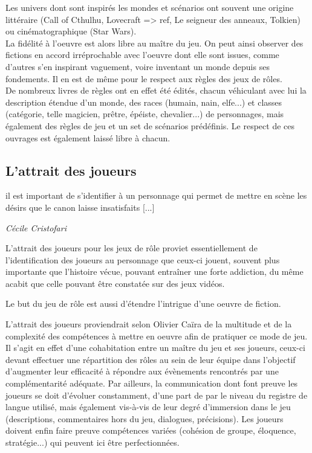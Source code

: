 Les univers dont sont inspirés les mondes et scénarios ont souvent une origine littéraire (Call of Cthulhu, Lovecraft => ref, Le seigneur des anneaux, Tolkien) ou cinématographique (Star Wars).\\
La fidélité à l'oeuvre est alors libre au maître du jeu. On peut ainsi observer des fictions en accord irréprochable avec l'oeuvre dont elle sont issues, comme d'autres s'en inspirant vaguement, voire inventant un monde depuis ses fondements. Il en est de même pour le respect aux règles des jeux de rôles.\\
De nombreux livres de règles ont en effet été édités, chacun véhiculant avec lui la description étendue d'un monde, des races (humain, nain, elfe...) et classes (catégorie, telle magicien, prêtre, épéiste, chevalier...) de personnages, mais également des règles de jeu et un set de scénarios prédéfinis. Le respect de ces ouvrages est également laissé libre à chacun.\\


\subsection{L'attrait des joueurs}
\begin{shadequote}
[...] il est important de s’identifier à un personnage qui permet de mettre en scène les désirs que le canon laisse insatisfaits [...]
\par\emph{C{\'e}cile Cristofari}
\end{shadequote}

L'attrait des joueurs pour les jeux de rôle proviet essentiellement de l'identification des joueurs au personnage que ceux-ci jouent, souvent plus importante que l'histoire vécue, pouvant entraîner une forte addiction, du même acabit que celle pouvant être constatée sur des jeux vidéos.

Le but du jeu de rôle est aussi d'étendre l'intrigue d'une oeuvre de fiction.

L'attrait des joueurs proviendrait selon Olivier Caïra\cite{caira2007jeux} de la multitude et de la complexité des compétences à mettre en oeuvre afin de pratiquer ce mode de jeu. Il s'agit en effet d'une cohabitation entre un maître du jeu et ses joueurs, ceux-ci devant effectuer une répartition des rôles au sein de leur équipe dans l'objectif d'augmenter leur efficacité à répondre aux évènements rencontrés par une complémentarité adéquate. Par ailleurs, la communication dont font preuve les joueurs se doit d'évoluer constamment, d'une part de par le niveau du registre de langue utilisé, mais également vis-à-vis de leur degré d'immersion dans le jeu (descriptions, commentaires hors du jeu, dialogues, précisions). Les joueurs doivent enfin faire preuve compétences variées (cohésion de groupe, éloquence, stratégie...) qui peuvent ici être perfectionnées.

